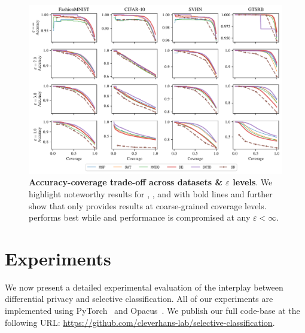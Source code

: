 \begin{figure}[t]
  \centering
  \includegraphics[width=\linewidth]{figs/sptd_dp/cov_acc.pdf}
\caption[Accuracy-coverage trade-off across datasets \& $\varepsilon$ levels.]{\textbf{Accuracy-coverage trade-off across datasets \& $\varepsilon$ levels}. We highlight noteworthy results for \sctd, \de, and \sn with bold lines and further show that \sn only provides results at coarse-grained coverage levels. \sctd performs best while \de and \sn performance is compromised at any $\varepsilon < \infty$.}
\label{fig:accuracy_coverage_tradeoff}
\end{figure}

\section{Experiments}
\label{sec:exp}

We now present a detailed experimental evaluation of the interplay between differential privacy and selective classification. All of our experiments are implemented using PyTorch~\citep{Paszke_PyTorch_An_Imperative_2019} and Opacus~\citep{opacus}. We publish our full code-base at the following URL: \url{https://github.com/cleverhans-lab/selective-classification}.


